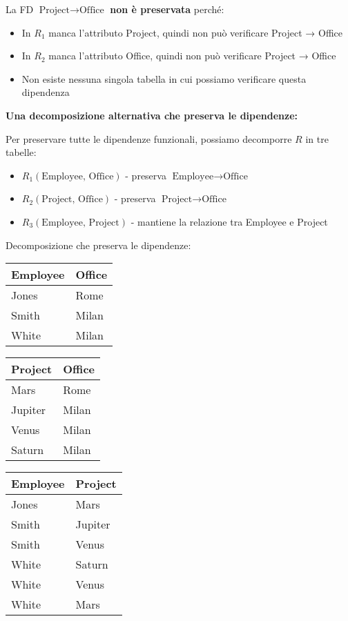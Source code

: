 \noindent La FD $\text{Project} \rightarrow \text{Office}$ \textbf{non è preservata} perché:
\begin{itemize}
	\item In $R_1$ manca l'attributo Project, quindi non può verificare Project → Office
	\item In $R_2$ manca l'attributo Office, quindi non può verificare Project → Office
	\item Non esiste nessuna singola tabella in cui possiamo verificare questa dipendenza
\end{itemize}

\noindent \textbf{Una decomposizione alternativa che preserva le dipendenze:}

Per preservare tutte le dipendenze funzionali, possiamo decomporre $R$ in tre tabelle:
\begin{itemize}
	\item $R_1(\text{Employee, Office})$ - preserva $\text{Employee} \rightarrow \text{Office}$
	\item $R_2(\text{Project, Office})$ - preserva $\text{Project} \rightarrow \text{Office}$
	\item $R_3(\text{Employee, Project})$ - mantiene la relazione tra Employee e Project
\end{itemize}

\noindent Decomposizione che preserva le dipendenze:
\begin{center}
\begin{tabular}{|l|l|}
	\hline
	\textbf{Employee} & \textbf{Office} \\ \hline
	Jones & Rome \\ \hline
	Smith & Milan \\ \hline
	White & Milan \\ \hline
\end{tabular}
\quad
\begin{tabular}{|l|l|}
	\hline
	\textbf{Project} & \textbf{Office} \\ \hline
	Mars & Rome \\ \hline
	Jupiter & Milan \\ \hline
	Venus & Milan \\ \hline
	Saturn & Milan \\ \hline
\end{tabular}
\quad
\begin{tabular}{|l|l|}
	\hline
	\textbf{Employee} & \textbf{Project} \\ \hline
	Jones & Mars \\ \hline
	Smith & Jupiter \\ \hline
	Smith & Venus \\ \hline
	White & Saturn \\ \hline
	White & Venus \\ \hline
	White & Mars \\ \hline
\end{tabular}
\end{center}

